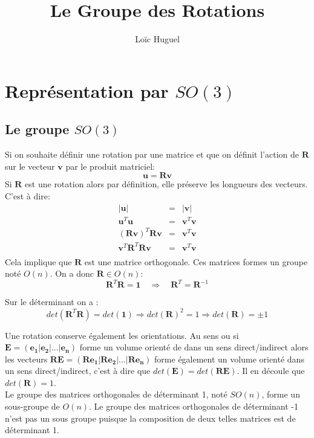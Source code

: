 \documentclass[12pt,a4paper]{article}
\title{Le Groupe des Rotations}
\author{Loïc Huguel}
\begin{document}
	\maketitle
	
	\tableofcontents
	
	\newpage
	\section{Représentation par $SO(3)$}
	
	\subsection{Le groupe $SO(3)$}
	
	Si on souhaite définir une rotation par une matrice et que on définit l'action de $\bm{R}$ sur le vecteur $\bm{v}$ par le produit matriciel:
	\[
		\bm{u}=\bm{R}\bm{v}
	\]
	Si $\bm{R}$ est une rotation alors par définition, elle préserve les longueurs des vecteurs. C'est à dire:
	\begin{eqnarray*}
		 |\bm{u}|&=&|\bm{v}|\\
		\bm{u}^T\bm{u}&=&\bm{v}^T\bm{v}\\
		(\bm{R}\bm{v})^T\bm{R}\bm{v}&=&\bm{v}^T\bm{v}\\
		\bm{v}^T\bm{R}^T\bm{R}\bm{v}&=&\bm{v}^T\bm{v}\\
	\end{eqnarray*}
	Cela implique que $\bm{R}$ est une matrice orthogonale. Ces matrices formes un groupe noté  $O(n)$. On a donc $\bm{R}\in O(n)$:
	\[
		\boxed{\bm{R}^T\bm{R}=\mathds{\bm{1}} \quad \Rightarrow \quad \bm{R}^T=\bm{R}^{-1}}
	\]

	Sur le déterminant on a :
	\[
	det(\bm{R}^T\bm{R})=det(\mathds{\bm{1}}) \Rightarrow det(\bm{R})^2= 1 \Rightarrow \boxed{det(\bm{R})=\pm 1}
	\]
	
	Une rotation conserve également les orientations. Au sens ou si $\bm{E}=(\bm{e_1}|\bm{e_2}|...|\bm{e_n})$ forme un volume orienté de dans un sens direct/indirect alors les vecteurs $\bm{R} \bm{E}=(\bm{R}\bm{e_1}|\bm{R}\bm{e_2}|...|\bm{R}\bm{e_n})$ forme également un volume orienté dans un sens direct/indirect, c'est à dire que $det(\bm{E})=det(\bm{R}\bm{E})$. Il en découle que $det(\bm{R})=1$.\\
		
	Le groupe des matrices orthogonales de déterminant 1, noté $SO(n)$, forme un sous-groupe de $O(n)$. Le groupe des matrices orthogonales de déterminant -1 n'est pas un sous groupe puisque la composition de deux telles matrices est de déterminant 1.\\
	
\end{document}
